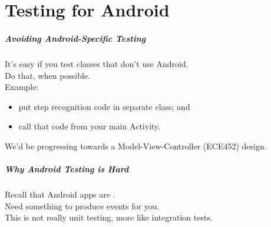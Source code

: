 \part{Testing for Android}
\frame{\partpage}

\begin{frame}
\frametitle{Avoiding Android-Specific Testing}

\begin{changemargin}{1cm}
It's easy if you test classes that don't use Android.\\[1em]

Do that, when possible.\\[1em]

Example:
\begin{itemize}
\item put step recognition code in separate class; and
\item call that code from your main Activity.
\end{itemize}
We'd be progressing towards a Model-View-Controller (ECE452) design.

\end{changemargin}
\end{frame}

\begin{frame}
\frametitle{Why Android Testing is Hard}

\begin{changemargin}{1cm}
Recall that Android apps are .\\[1em]

Need something to produce events for you.\\[1em]

This is not really unit testing, more like integration tests.
\end{changemargin}
\end{frame}


